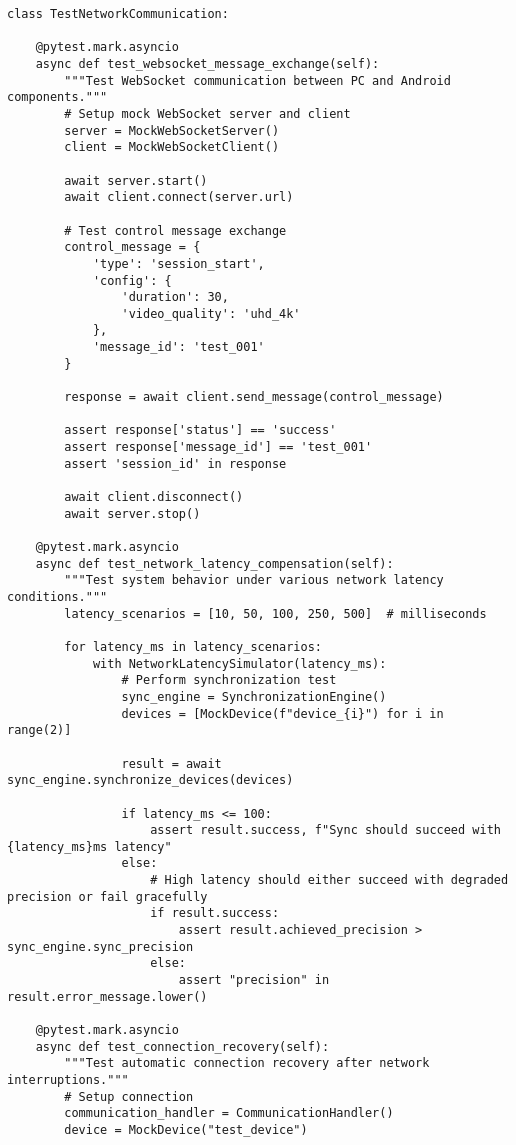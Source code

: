 \documentclass[11pt,a4paper]{report}
\begin{document}
\begin{verbatim}
class TestNetworkCommunication:

    @pytest.mark.asyncio
    async def test_websocket_message_exchange(self):
        """Test WebSocket communication between PC and Android components."""
        # Setup mock WebSocket server and client
        server = MockWebSocketServer()
        client = MockWebSocketClient()

        await server.start()
        await client.connect(server.url)

        # Test control message exchange
        control_message = {
            'type': 'session_start',
            'config': {
                'duration': 30,
                'video_quality': 'uhd_4k'
            },
            'message_id': 'test_001'
        }

        response = await client.send_message(control_message)

        assert response['status'] == 'success'
        assert response['message_id'] == 'test_001'
        assert 'session_id' in response

        await client.disconnect()
        await server.stop()

    @pytest.mark.asyncio
    async def test_network_latency_compensation(self):
        """Test system behavior under various network latency conditions."""
        latency_scenarios = [10, 50, 100, 250, 500]  # milliseconds

        for latency_ms in latency_scenarios:
            with NetworkLatencySimulator(latency_ms):
                # Perform synchronization test
                sync_engine = SynchronizationEngine()
                devices = [MockDevice(f"device_{i}") for i in range(2)]

                result = await sync_engine.synchronize_devices(devices)

                if latency_ms <= 100:
                    assert result.success, f"Sync should succeed with {latency_ms}ms latency"
                else:
                    # High latency should either succeed with degraded precision or fail gracefully
                    if result.success:
                        assert result.achieved_precision > sync_engine.sync_precision
                    else:
                        assert "precision" in result.error_message.lower()

    @pytest.mark.asyncio
    async def test_connection_recovery(self):
        """Test automatic connection recovery after network interruptions."""
        # Setup connection
        communication_handler = CommunicationHandler()
        device = MockDevice("test_device")


\end{verbatim}
\end{document}
